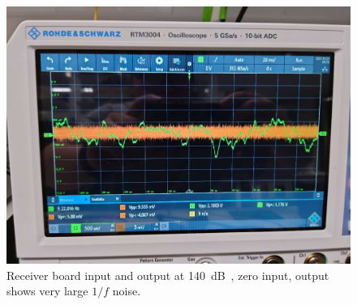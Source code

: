 \begin{figure}[htbp]
\centerline{\includegraphics[width=0.9\linewidth]{4-ANC_Sys/LargeNoiseRecBoard.jpg}}
\caption{Receiver board input and output at \qty{140}{dB\Omega}, zero input, output shows very large $1/f$ noise.}
\label{fig_ReceiverBoardLargeNoise}
\end{figure}


